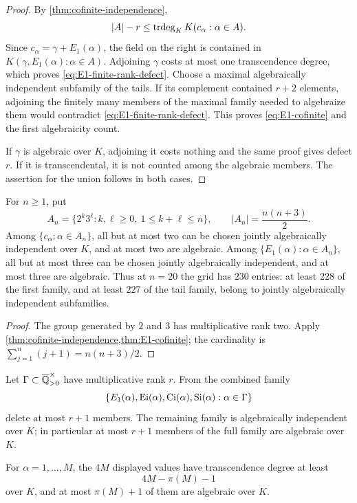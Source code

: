 \begin{proof}
By \cref{thm:cofinite-independence},
\[
 |A|-r\le\operatorname{trdeg}_KK(c_\alpha:\alpha\in A).
\]
Since \(c_\alpha=\gamma+E_1(\alpha)\), the field on the right is contained
in \(K(\gamma,E_1(\alpha):\alpha\in A)\).  Adjoining \(\gamma\) costs at
most one transcendence degree, which proves
\eqref{eq:E1-finite-rank-defect}.  Choose a maximal algebraically
independent subfamily of the tails.  If its complement contained \(r+2\)
elements, adjoining the finitely many members of the maximal family needed
to algebraize them would contradict \eqref{eq:E1-finite-rank-defect}.
This proves \eqref{eq:E1-cofinite} and the first algebraicity count.

If \(\gamma\) is algebraic over \(K\), adjoining it costs nothing and the
same proof gives defect \(r\).  If it is transcendental, it is not counted
among the algebraic members.  The assertion for the union follows in both
cases.
\end{proof}

\begin{corollary}
\label{cor:two-prime-grid}
For \(n\ge1\), put
\[
 A_n=\{2^k3^\ell:k,\ell\ge0,\ 1\le k+\ell\le n\},
 \qquad |A_n|=\frac{n(n+3)}2.
\]
Among \(\{c_\alpha:\alpha\in A_n\}\), all but at most two can be chosen
jointly algebraically independent over \(K\), and at most two are
algebraic.  Among \(\{E_1(\alpha):\alpha\in A_n\}\), all but at most three
can be chosen jointly algebraically independent, and at most three are
algebraic.  Thus at \(n=20\) the grid has \(230\) entries: at least \(228\)
of the first family, and at least \(227\) of the tail family, belong to
jointly algebraically independent subfamilies.
\end{corollary}

\begin{proof}
The group generated by \(2\) and \(3\) has multiplicative rank two.  Apply
\cref{thm:cofinite-independence,thm:E1-cofinite}; the cardinality is
\(\sum_{j=1}^n(j+1)=n(n+3)/2\).
\end{proof}

\begin{corollary}
\label{cor:four-classical-cofinite}
Let \(\Gamma\subset\overline{\mathbb Q}_{>0}^{\times}\) have multiplicative rank \(r\).
From the combined family
\begin{equation}\label{eq:four-classical-family}
 \{E_1(\alpha),\operatorname{Ei}(\alpha),\operatorname{Ci}(\alpha),
   \operatorname{Si}(\alpha):\alpha\in\Gamma\}
\end{equation}
delete at most \(r+1\) members.  The remaining family is algebraically
independent over \(K\); in particular at most \(r+1\) members of the full
family are algebraic over \(K\).

For \(\alpha=1,\ldots,M\), the \(4M\) displayed values have transcendence
degree at least
\begin{equation}\label{eq:four-classical-integer-count}
 4M-\pi(M)-1
\end{equation}
over \(K\), and at most \(\pi(M)+1\) of them are algebraic over \(K\).
\end{corollary}

